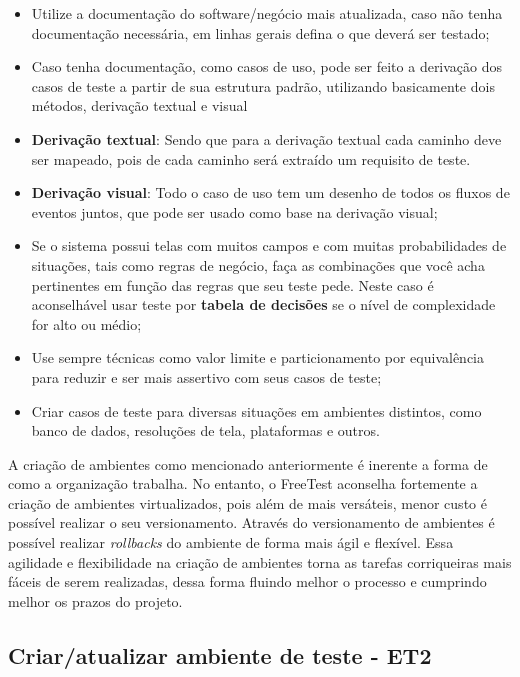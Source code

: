 \begin{itemize}
    \item Utilize a documentação do software/negócio mais atualizada, caso não tenha documentação necessária, em linhas gerais defina o que deverá ser testado;
    \item Caso tenha documentação, como casos de uso, pode ser feito a derivação dos casos de teste a partir de sua estrutura padrão, utilizando basicamente dois métodos, derivação textual e visual
    \item \textbf{Derivação textual}: Sendo que para a derivação textual cada caminho deve ser mapeado, pois de cada caminho será extraído um requisito de teste.
    \item \textbf{Derivação visual}: Todo o caso de uso tem um desenho de todos os fluxos de eventos juntos, que pode ser usado como base na derivação visual;
    \item Se o sistema possui telas com muitos campos e com muitas probabilidades de situações, tais como regras de negócio, faça as combinações que você acha pertinentes em função das regras que seu teste pede. Neste caso é aconselhável usar teste por \textbf{tabela de decisões} se o nível de complexidade for alto ou médio;
    \item Use sempre técnicas como valor limite e particionamento por equivalência para reduzir e ser mais assertivo com seus casos de teste;
    \item Criar casos de teste para diversas situações em ambientes distintos, como banco de dados, resoluções de tela, plataformas e outros.
\end{itemize}

A criação de ambientes como mencionado anteriormente é inerente a forma de como a organização trabalha. No entanto, o FreeTest aconselha fortemente a criação de ambientes virtualizados, pois além de mais versáteis, menor custo é possível realizar o seu versionamento. Através do versionamento de ambientes é possível realizar \textit{rollbacks} do ambiente de forma mais ágil e flexível. Essa agilidade e flexibilidade na criação de ambientes torna as tarefas corriqueiras mais fáceis de serem realizadas, dessa forma fluindo melhor o processo e cumprindo melhor os prazos do projeto.

\subsection{Criar/atualizar ambiente de teste - ET2}
\label{sec:guiaet2}

